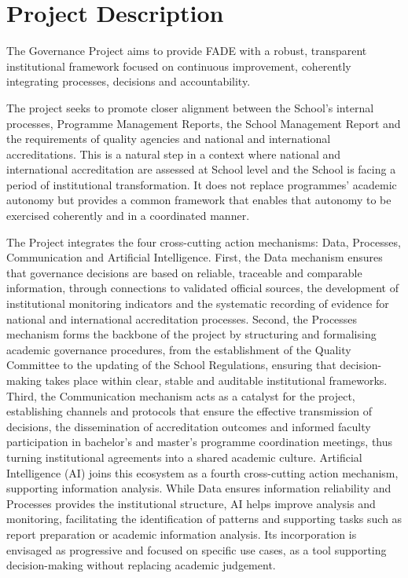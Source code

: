 \documentclass[11pt,a4paper]{scrreprt}
\begin{document}
\section{Project Description}

The Governance Project aims to provide FADE with a robust, transparent institutional framework focused on continuous improvement, coherently integrating processes, decisions and accountability.   

The project seeks to promote closer alignment between the School's internal processes, Programme Management Reports, the School Management Report and the requirements of quality agencies and national and international accreditations. This is a natural step in a context where national and international accreditation are assessed at School level and the School is facing a period of institutional transformation. It does not replace programmes' academic autonomy but provides a common framework that enables that autonomy to be exercised coherently and in a coordinated manner. 

The Project integrates the four cross-cutting action mechanisms: Data, Processes, Communication and Artificial Intelligence. First, the Data mechanism ensures that governance decisions are based on reliable, traceable and comparable information, through connections to validated official sources, the development of institutional monitoring indicators and the systematic recording of evidence for national and international accreditation processes. Second, the Processes mechanism forms the backbone of the project by structuring and formalising academic governance procedures, from the establishment of the Quality Committee to the updating of the School Regulations, ensuring that decision-making takes place within clear, stable and auditable institutional frameworks. Third, the Communication mechanism acts as a catalyst for the project, establishing channels and protocols that ensure the effective transmission of decisions, the dissemination of accreditation outcomes and informed faculty participation in bachelor's and master's programme coordination meetings, thus turning institutional agreements into a shared academic culture. Artificial Intelligence (AI) joins this ecosystem as a fourth cross-cutting action mechanism, supporting information analysis. While Data ensures information reliability and Processes provides the institutional structure, AI helps improve analysis and monitoring, facilitating the identification of patterns and supporting tasks such as report preparation or academic information analysis. Its incorporation is envisaged as progressive and focused on specific use cases, as a tool supporting decision-making without replacing academic judgement. 
\end{document}
